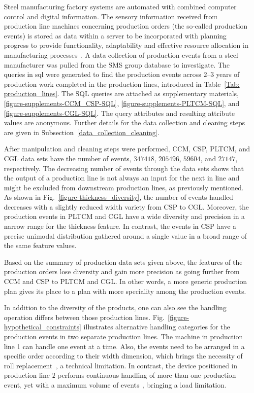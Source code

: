 Steel manufacturing factory systems are automated with combined computer control and digital information. The sensory information received from production line machines concerning production orders (the so-called production events) is stored as data within a server to be incorporated with planning progress to provide functionality, adaptability and effective resource allocation in manufacturing processes~\cite{Saadaoui2019}. A data collection of production events from a steel manufacturer was pulled from the SMS group database to investigate. The queries in \ac{sql} were generated to find the production events across $2$--$3$ years of production work completed in the production lines, introduced in Table~\ref{Tab: production_lines}. The SQL queries are attached as supplementary materials, \ref{figure-supplements-CCM_CSP-SQL}, \ref{figure-supplements-PLTCM-SQL}, and \ref{figure-supplements-CGL-SQL}. The query attributes and resulting attribute values are anonymous. Further details for the data collection and cleaning steps are given in Subsection~\ref{data_collection_cleaning}.

After manipulation and cleaning steps were performed, CCM, CSP, PLTCM, and CGL data sets have the number of events, $347418$, $205496$, $59604$, and $27147$, respectively. The decreasing number of events through the data sets shows that the output of a production line is not always an input for the next in line and might be excluded from downstream production lines, as previously mentioned. As shown in Fig.~\ref{figure-thickness_diversity}, the number of events handled decreases with a slightly reduced width variety from CSP to CGL. Moreover, the production events in PLTCM and CGL have a wide diversity and precision in a narrow range for the thickness feature. In contrast, the events in CSP have a precise unimodal distribution gathered around a single value in a broad range of the same feature values.



Based on the summary of production data sets given above, the features of the production orders lose diversity and gain more precision as going further from CCM and CSP to PLTCM and CGL. In other words, a more generic production plan gives its place to a plan with more speciality among the production events.



In addition to the diversity of the products, one can also see the handling operation differs between those production lines. Fig.~\ref{figure-hypothetical_constraints} illustrates alternative handling categories for the production events in two separate production lines. The machine in production line 1 can handle one event at a time. Also, the events need to be arranged in a specific order according to their width dimension, which brings the necessity of roll replacement~\cite{OZGUR2021106606}, a technical limitation. In contrast, the device positioned in production line 2 performs continuous handling of more than one production event, yet with a maximum volume of events~\cite{takase2011strength}, bringing a load limitation.


